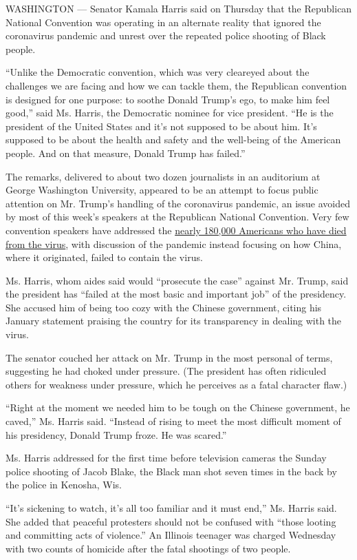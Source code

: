 WASHINGTON --- Senator Kamala Harris said on Thursday that the
Republican National Convention was operating in an alternate reality
that ignored the coronavirus pandemic and unrest over the repeated
police shooting of Black people.

``Unlike the Democratic convention, which was very cleareyed about the
challenges we are facing and how we can tackle them, the Republican
convention is designed for one purpose: to soothe Donald Trump's ego, to
make him feel good,'' said Ms. Harris, the Democratic nominee for vice
president. ``He is the president of the United States and it's not
supposed to be about him. It's supposed to be about the health and
safety and the well-being of the American people. And on that measure,
Donald Trump has failed.''

The remarks, delivered to about two dozen journalists in an auditorium
at George Washington University, appeared to be an attempt to focus
public attention on Mr. Trump's handling of the coronavirus pandemic, an
issue avoided by most of this week's speakers at the Republican National
Convention. Very few convention speakers have addressed the
\href{https://www.nytimes3xbfgragh.onion/interactive/2020/us/coronavirus-us-cases.html}{nearly
180,000 Americans who have died from the virus}, with discussion of the
pandemic instead focusing on how China, where it originated, failed to
contain the virus.

Ms. Harris, whom aides said would ``prosecute the case'' against Mr.
Trump, said the president has ``failed at the most basic and important
job'' of the presidency. She accused him of being too cozy with the
Chinese government, citing his January statement praising the country
for its transparency in dealing with the virus.

The senator couched her attack on Mr. Trump in the most personal of
terms, suggesting he had choked under pressure. (The president has often
ridiculed others for weakness under pressure, which he perceives as a
fatal character flaw.)

``Right at the moment we needed him to be tough on the Chinese
government, he caved,'' Ms. Harris said. ``Instead of rising to meet the
most difficult moment of his presidency, Donald Trump froze. He was
scared.''

Ms. Harris addressed for the first time before television cameras the
Sunday police shooting of Jacob Blake, the Black man shot seven times in
the back by the police in Kenosha, Wis.

``It's sickening to watch, it's all too familiar and it must end,'' Ms.
Harris said. She added that peaceful protesters should not be confused
with ``those looting and committing acts of violence.'' An Illinois
teenager was charged Wednesday with two counts of homicide after the
fatal shootings of two people.

